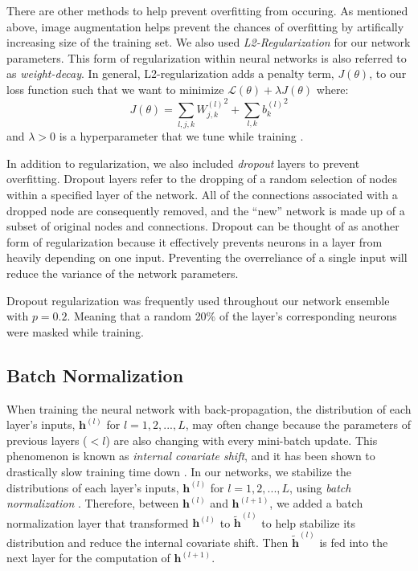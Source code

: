 \documentclass [MAS] {uclathes}
\begin{document}
There are other methods to help prevent overfitting from occuring. As mentioned above, image augmentation helps prevent the chances of overfitting by artifically increasing size of the training set. We also used \textit{L2-Regularization} for our network parameters. This form of regularization within neural networks is also referred to as \textit{weight-decay}. In general, L2-regularization adds a penalty term, $J(\theta)$, to our loss function such that we want to minimize $\mathcal{L}(\theta) + \lambda J(\theta)$ where: $$J(\theta) = \sum_{l, j, k} {W^{(l)}_{j, k}}^2 + \sum_{l, k} {b^{(l)}_{k}}^2$$ and $\lambda > 0$ is a hyperparameter that we tune while training \cite{ESL}. 

In addition to regularization, we also included \textit{dropout} layers to prevent overfitting. Dropout layers refer to the dropping of a random selection of nodes within a specified layer of the network. All of the connections associated with a dropped node are consequently removed, and the ``new'' network is made up of a subset of original nodes and connections. Dropout can be thought of as another form of regularization because it effectively prevents neurons in a layer from heavily depending on one input. Preventing the overreliance of a single input will reduce the variance of the network parameters. 

Dropout regularization was frequently used throughout our network ensemble with $p = 0.2$. Meaning that a random 20\% of the layer's corresponding neurons were masked while training. 


\subsection{Batch Normalization}

When training the neural network with back-propagation, the distribution of each layer's inputs, $\mathbf{h}^{(l)}$ for $l=1, 2, ..., L$, may often change because the parameters of previous layers ($< l$) are also changing with every mini-batch update. This phenomenon is known as \textit{internal covariate shift}, and it has been shown to drastically slow training time down \cite{BatchNorm}. In our networks, we stabilize the distributions of each layer's inputs, $\mathbf{h}^{(l)}$ for $l=1, 2, ..., L$, using \textit{batch normalization} \cite{BatchNorm}. Therefore, between $\mathbf h^{(l)}$ and $\mathbf h^{(l+1)}$, we added a batch normalization layer that transformed $\mathbf{h}^{(l)}$ to $\tilde{\mathbf{h}}^{(l)}$ to help stabilize its distribution and reduce the internal covariate shift. Then $\tilde{\mathbf{h}}^{(l)}$ is fed into the next layer for the computation of $\mathbf{h}^{(l+1)}$. 
\end{document}
